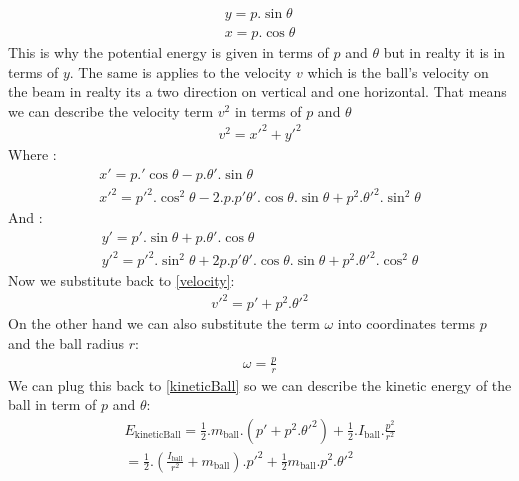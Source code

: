 \documentclass{article}
\begin{document}
\begin{equation}
	\begin{split}
		y = p.\sin{\theta}\\
		x = p.\cos{\theta}
	\end{split}
\end{equation}
This is why the potential energy is given in terms of $p$ and $\theta$ but in realty it is in terms of $y$.
The same is applies to the velocity $v$ which is the ball's velocity on the beam in realty its a two direction on vertical and one horizontal.
That means we can describe the velocity term $v^2$ in terms of $p$ and $\theta$
\begin{equation}\label{velocity}
	\begin{split}
		v^2 = x'^2 + y'^2 
	\end{split}
\end{equation}
Where :
\begin{equation}
	\begin{split}
		x' = p.'\cos{\theta} - p.\theta'.\sin{\theta}\\
		x'^2 = p'^2.\cos^2{\theta} - 2.p.p'\theta'.\cos{\theta}.\sin{\theta}+ p^2.\theta'^2.\sin^2{\theta}
	\end{split}
\end{equation}
And :
\begin{equation}
	\begin{split}
		y'= p'.\sin{\theta}+p.\theta'.\cos{\theta} \\
		y'^2 = p'^2.\sin^2{\theta}+ 2p.p'\theta'.\cos{\theta}.\sin{\theta}+p^2.\theta'^2.\cos^2{\theta}
	\end{split}
\end{equation}
Now we substitute back to \ref{velocity}:
\begin{equation}
	\begin{split}
		v'^2 = p' + p^2.\theta'^2
	\end{split}
\end{equation}
On the other hand we can also substitute the term $\omega$ into coordinates terms $p$ and the ball radius $r$:
\begin{equation}
	\begin{split}
		\omega = \frac{p}{r}
	\end{split}
\end{equation}
We can plug this back to \ref{kineticBall} so we can describe the kinetic energy of the ball in term of $p$ and $\theta$:
\begin{equation}
	\begin{aligned}
		E_{\text{kineticBall}} = \frac{1}{2}.m_{\text{ball}}.(p' + p^2.\theta'^2) + \frac{1}{2}.I_{\text{ball}}.\frac{p^2}{r^2}\\
		= \frac{1}{2}.(\frac{I_{\text{ball}}}{r^2}+m_{\text{ball}}).p'^2 + \frac{1}{2} m_{\text{ball}}.p^2.\theta'^2
	\end{aligned}
\end{equation}
\end{document}
